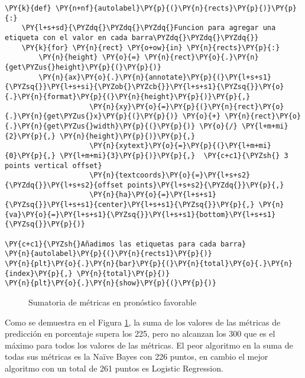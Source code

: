 \begin{tcolorbox}[breakable, size=fbox, boxrule=1pt, pad at break*=1mm,colback=cellbackground, colframe=cellborder]
\begin{Verbatim}[commandchars=\\\{\}]
\PY{k}{def} \PY{n+nf}{autolabel}\PY{p}{(}\PY{n}{rects}\PY{p}{)}\PY{p}{:}
    \PY{l+s+sd}{\PYZdq{}\PYZdq{}\PYZdq{}Funcion para agregar una etiqueta con el valor en cada barra\PYZdq{}\PYZdq{}\PYZdq{}}
    \PY{k}{for} \PY{n}{rect} \PY{o+ow}{in} \PY{n}{rects}\PY{p}{:}
        \PY{n}{height} \PY{o}{=} \PY{n}{rect}\PY{o}{.}\PY{n}{get\PYZus{}height}\PY{p}{(}\PY{p}{)}
        \PY{n}{ax}\PY{o}{.}\PY{n}{annotate}\PY{p}{(}\PY{l+s+s1}{\PYZsq{}}\PY{l+s+si}{\PYZob{}\PYZcb{}}\PY{l+s+s1}{\PYZsq{}}\PY{o}{.}\PY{n}{format}\PY{p}{(}\PY{n}{height}\PY{p}{)}\PY{p}{,}
                    \PY{n}{xy}\PY{o}{=}\PY{p}{(}\PY{n}{rect}\PY{o}{.}\PY{n}{get\PYZus{}x}\PY{p}{(}\PY{p}{)} \PY{o}{+} \PY{n}{rect}\PY{o}{.}\PY{n}{get\PYZus{}width}\PY{p}{(}\PY{p}{)} \PY{o}{/} \PY{l+m+mi}{2}\PY{p}{,} \PY{n}{height}\PY{p}{)}\PY{p}{,}
                    \PY{n}{xytext}\PY{o}{=}\PY{p}{(}\PY{l+m+mi}{0}\PY{p}{,} \PY{l+m+mi}{3}\PY{p}{)}\PY{p}{,}  \PY{c+c1}{\PYZsh{} 3 points vertical offset}
                    \PY{n}{textcoords}\PY{o}{=}\PY{l+s+s2}{\PYZdq{}}\PY{l+s+s2}{offset points}\PY{l+s+s2}{\PYZdq{}}\PY{p}{,}
                    \PY{n}{ha}\PY{o}{=}\PY{l+s+s1}{\PYZsq{}}\PY{l+s+s1}{center}\PY{l+s+s1}{\PYZsq{}}\PY{p}{,} \PY{n}{va}\PY{o}{=}\PY{l+s+s1}{\PYZsq{}}\PY{l+s+s1}{bottom}\PY{l+s+s1}{\PYZsq{}}\PY{p}{)}

\PY{c+c1}{\PYZsh{}Añadimos las etiquetas para cada barra}
\PY{n}{autolabel}\PY{p}{(}\PY{n}{rects1}\PY{p}{)}
\PY{n}{plt}\PY{o}{.}\PY{n}{bar}\PY{p}{(}\PY{n}{total}\PY{o}{.}\PY{n}{index}\PY{p}{,} \PY{n}{total}\PY{p}{)}
\PY{n}{plt}\PY{o}{.}\PY{n}{show}\PY{p}{(}\PY{p}{)}
\end{Verbatim}
\end{tcolorbox}

\begin{center}
    	\begin{figure}[H]
	\centering
	\caption{Sumatoria de métricas en pronóstico favorable}
	\label{fig:smpf}
	\end{figure}
\end{center}
    
    Como se demuestra en el Figura \ref{fig:smpf}, la suma de los valores de las métricas de predicción en porcentaje supera los 225, pero no alcanzan los 300 que es el máximo para todos los valores de las métricas. El peor algoritmo en la suma de todas sus métricas es la Naïve Bayes con 226 puntos, en cambio el mejor algoritmo con un total de 261 puntos es Logistic Regression.

